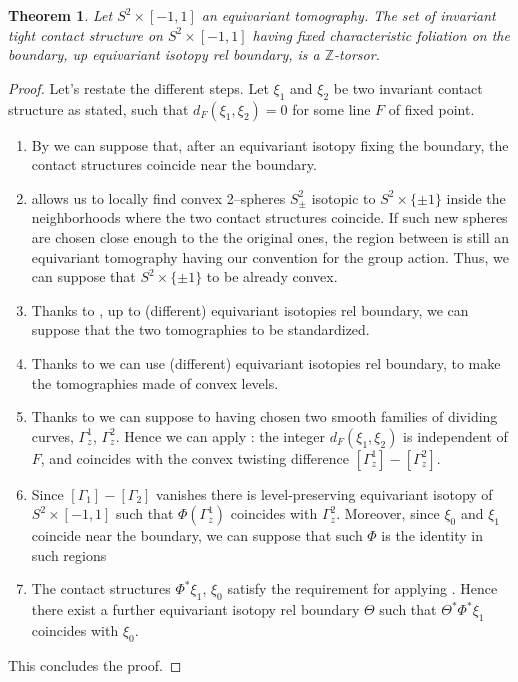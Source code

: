 \documentclass[a4paper, 11pt]{amsart}
\theoremstyle{plain}
\newtheorem{thmR}{Theorem}
\theoremstyle{definition}
\newcommand{\Z}{\mathbb{Z}}
\begin{document}
\addtocounter{thmR}{-1} 
\begin{thmR}
	Let $S^2 \times [-1,1]$ an equivariant tomography. The set of invariant tight contact structure on $S^2 \times [-1,1]$ having fixed characteristic foliation on the boundary, up equivariant isotopy rel boundary, is a $\Z$-torsor.
\end{thmR}
\begin{proof}
	Let's restate the different steps. Let $\xi_1$ and $\xi_2$ be two invariant contact structure as stated, such that $d_F(\xi_1, \xi_2) = 0$ for some line $F$ of fixed point.
	\begin{enumerate}
		\item By  we can suppose that, after an equivariant isotopy fixing the boundary, the contact structures coincide near the boundary.
		\item {} allows us to locally find convex 2–spheres $S^2_\pm$ isotopic to $S^2 \times \{\pm1\}$ inside the neighborhoods where the two contact structures coincide. If such new spheres are chosen close enough to the the original ones, the region between is still an equivariant tomography having our convention for the group action. Thus, we can suppose that $S^2 \times \{\pm1\}$ to be already convex.
		\item Thanks to , up to (different) equivariant isotopies rel boundary, we can suppose that the two tomographies to be standardized.
		\item Thanks to  we can use (different) equivariant isotopies rel boundary, to make the tomographies made of convex levels.
		\item Thanks to  we can suppose to having chosen two smooth families of dividing curves, $\Gamma_z^1$, $\Gamma_z^2$. Hence we can apply : the integer $d_F(\xi_1, \xi_2)$ is independent of $F$, and coincides with the convex twisting difference $[\Gamma^1_z] - [\Gamma^2_z]$.
		\item Since $[\Gamma_1]-[\Gamma_2]$ vanishes there is level-preserving equivariant isotopy of $S^2 \times [-1,1]$ such that  $\Phi(\Gamma^1_z)$ coincides with $\Gamma^2_z$. Moreover, since $\xi_0$ and $\xi_1$ coincide near the boundary, we can suppose that such $\Phi$ is the identity in such regions
		\item The contact structures $\Phi^*\xi_1$, $\xi_0$ satisfy the requirement for applying . Hence there exist a further equivariant isotopy rel boundary $\Theta$ such that $\Theta^*\Phi^*\xi_1$ coincides with $\xi_0$.
	\end{enumerate}
	This concludes the proof.
\end{proof}
\end{document}

